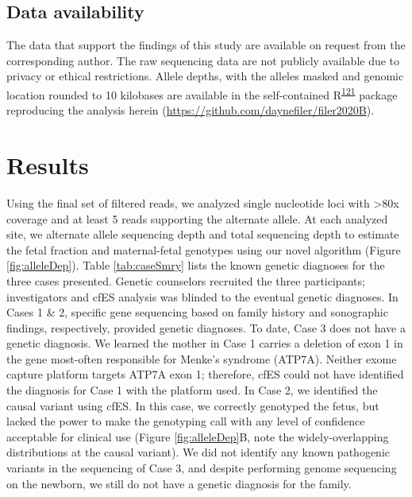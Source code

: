 \documentclass[11pt,letterpaper,oneside]{book}
\begin{document}
\hypertarget{data-availability}{%
\subsection{Data availability}\label{data-availability}}

The data that support the findings of this study are available on request from the corresponding author.
The raw sequencing data are not publicly available due to privacy or ethical restrictions.
Allele depths, with the alleles masked and genomic location rounded to 10 kilobases are available in the self-contained R\textsuperscript{\protect\hyperlink{ref-r-core-team:2019aa}{121}} package reproducing the analysis herein (\url{https://github.com/daynefiler/filer2020B}).

\hypertarget{results-1}{%
\section{Results}\label{results-1}}

Using the final set of filtered reads, we analyzed single nucleotide loci with \textgreater80x coverage and at least 5 reads supporting the alternate allele.
At each analyzed site, we alternate allele sequencing depth and total sequencing depth to estimate the fetal fraction and maternal-fetal genotypes using our novel algorithm (Figure \ref{fig:alleleDep}).
Table \ref{tab:caseSmry} lists the known genetic diagnoses for the three cases presented.
Genetic counselors recruited the three participants; investigators and cfES analysis was blinded to the eventual genetic diagnoses.
In Cases 1 \& 2, specific gene sequencing based on family history and sonographic findings, respectively, provided genetic diagnoses.
To date, Case 3 does not have a genetic diagnosis.
We learned the mother in Case 1 carries a deletion of exon 1 in the gene most-often responsible for Menke's syndrome (ATP7A).
Neither exome capture platform targets ATP7A exon 1; therefore, cfES could not have identified the diagnosis for Case 1 with the platform used.
In Case 2, we identified the causal variant using cfES.
In this case, we correctly genotyped the fetus, but lacked the power to make the genotyping call with any level of confidence acceptable for clinical use (Figure \ref{fig:alleleDep}B, note the widely-overlapping distributions at the causal variant).
We did not identify any known pathogenic variants in the sequencing of Case 3, and despite performing genome sequencing on the newborn, we still do not have a genetic diagnosis for the family.
\end{document}
